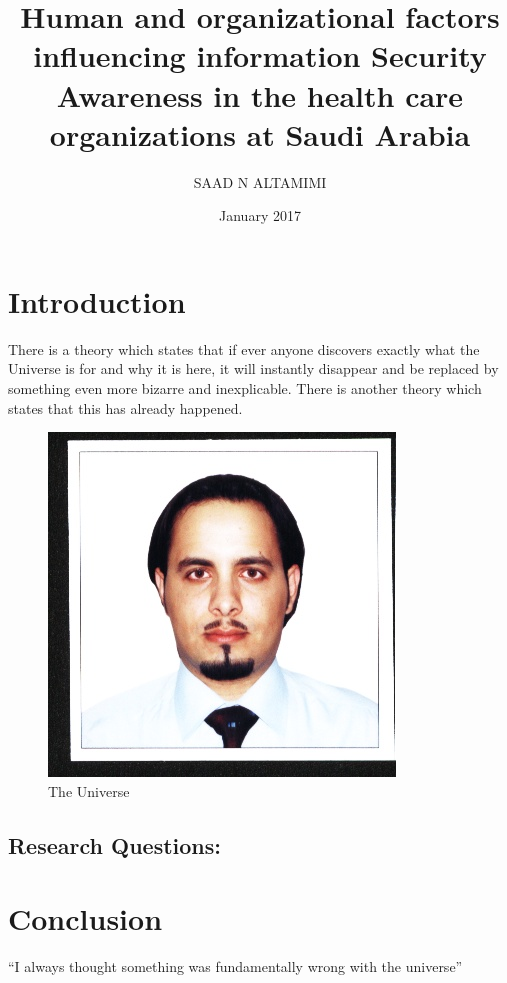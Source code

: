\documentclass{article}
\title{ Human and organizational factors influencing information Security Awareness in the health care organizations at Saudi Arabia}
\author{SAAD N ALTAMIMI}
\date{January 2017}
\begin{document}
\maketitle

\section{Introduction}
There is a theory which states that if ever anyone discovers exactly what the Universe is for and why it is here, it will instantly disappear and be replaced by something even more bizarre and inexplicable.
There is another theory which states that this has already happened.

\begin{figure}[h!]
\centering
\includegraphics[scale=0.5]{saadPic.jpg}
\caption{The Universe}
\label{fig:univerise}
\end{figure}

\subsection {Research Questions:}


\section{Conclusion}
``I always thought something was fundamentally wrong with the universe'' \citep{adams1995hitchhiker}



\end{document}
